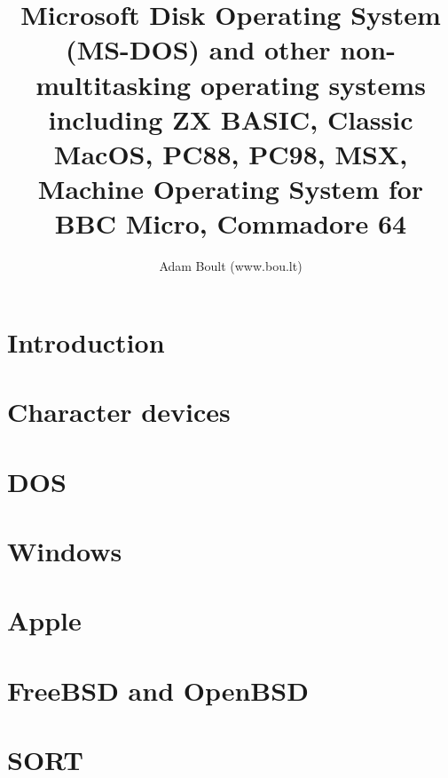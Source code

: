 \documentclass[oneside]{book}
\begin{document}
\author{Adam Boult (www.bou.lt)}
\title{Microsoft Disk Operating System (MS-DOS) and other non-multitasking operating systems including ZX BASIC, Classic MacOS, PC88, PC98, MSX, Machine Operating System for BBC Micro, Commadore 64}
\maketitle

\setcounter{tocdepth}{0}
\tableofcontents



\part{Introduction}

\part{Character devices}


\part{DOS}

\part{Windows}

\part{Apple}

\part{FreeBSD and OpenBSD}

\part{SORT}

\end{document}
